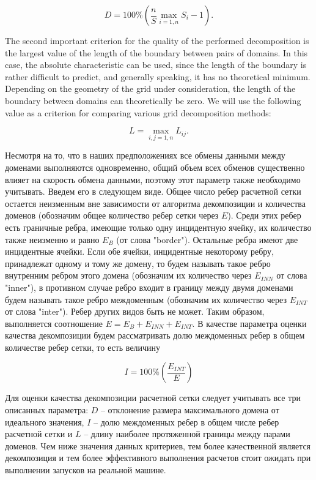 \documentclass[
11pt,%
tightenlines,%
twoside,%
onecolumn,%
nofloats,%
nobibnotes,%
nofootinbib,%
superscriptaddress,%
noshowpacs,%
centertags]%
{revtex4}
\begin{document}
\begin{equation}
D = 100 \% \left( \frac{n}{S} \max_{i=1,n}{S_i} - 1 \right).
\end{equation}

The second important criterion for the quality of the performed decomposition is the largest value of the length of the boundary between pairs of domains.
In this case, the absolute characteristic can be used, since the length of the boundary is rather difficult to predict, and generally speaking, it has no theoretical minimum.
Depending on the geometry of the grid under consideration, the length of the boundary between domains can theoretically be zero.
We will use the following value as a criterion for comparing various grid decomposition methods:

\begin{equation}
L = \max_{i,j=1,n}{L_{ij}}.
\end{equation}

Несмотря на то, что в наших предположениях все обмены данными между доменами выполняются одновременно, общий объем всех обменов существенно влияет на скорость обмена данными, поэтому этот параметр также необходимо учитывать.
Введем его в следующем виде.
Общее число ребер расчетной сетки остается неизменным вне зависимости от алгоритма декомпозиции и количества доменов (обозначим общее количество ребер сетки через $E$).
Среди этих ребер есть граничные ребра, имеющие только одну инцидентную ячейку, их количество также неизменно и равно $E_B$ (от слова "border").
Остальные ребра имеют две инцидентные ячейки.
Если обе ячейки, инцидентные некоторому ребру, принадлежат одному и тому же домену, то будем называть такое ребро внутренним ребром этого домена (обозначим их количество через $E_{INN}$ от слова "inner"), в противном случае ребро входит в границу между двумя доменами будем называть такое ребро междоменным (обозначим их количество через $E_{INT}$ от слова "inter").
Ребер других видов быть не может.
Таким образом, выполняется соотношение $E = E_B + E_{INN} + E_{INT}$.
В качестве параметра оценки качества декомпозиции будем рассматривать долю междоменных ребер в общем количестве ребер сетки, то есть величину

\begin{equation}
I = 100 \% \left( \frac{E_{INT}}{E} \right)
\end{equation}
	  
Для оценки качества декомпозиции расчетной сетки следует учитывать все три описанных параметра: $D$ -- отклонение размера максимального домена от идеального значения, $I$ -- долю междоменных ребер в общем числе ребер расчетной сетки и $L$ -- длину наиболее протяженной границы между парами доменов.
Чем ниже значения данных критериев, тем более качественной является декомпозиция и тем более эффективного выполнения расчетов стоит ожидать при выполнении запусков на реальной машине.
\end{document}
